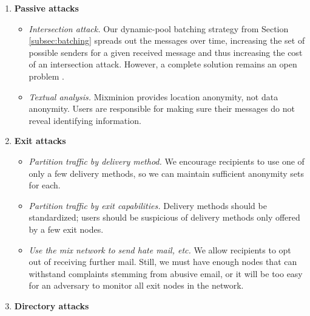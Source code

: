 \documentclass[final,inpress,inline]{ieee}
\begin{document}
\begin{enumerate}
\item \textbf{Passive attacks}

\begin{itemize}
\item \emph{Intersection attack.} Our dynamic-pool batching strategy
from Section \ref{subsec:batching} spreads out the messages over time,
increasing the set of possible senders for a given received message and
thus increasing the cost of an intersection attack. However, a complete
solution remains an open problem \cite{langos02}.
\item \emph{Textual analysis.} Mixminion provides location anonymity,
not data anonymity. Users are responsible for making sure their messages
do not reveal identifying information.
\end{itemize}

\item \textbf{Exit attacks}

\begin{itemize}
\item \emph{Partition traffic by delivery method.} We encourage recipients
to use one of only a few delivery methods, so we can maintain sufficient
anonymity sets for each.
\item \emph{Partition traffic by exit capabilities.}
Delivery methods should be standardized; users should be suspicious of
delivery methods only offered by a few exit nodes.
\item \emph{Use the mix network to send hate mail, etc.} We allow
recipients to opt out of receiving further mail.  Still, we must have
enough nodes that can withstand complaints stemming from abusive
email, or it will be too easy for an adversary to monitor all exit nodes in
the network.
\end{itemize}

\item \textbf{Directory attacks}


\end{enumerate}
\end{document}
